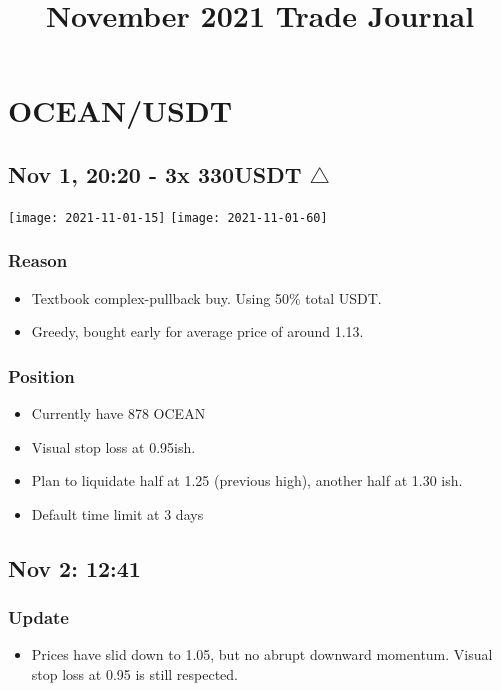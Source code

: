 \documentclass{../notes}
\title{November 2021 Trade Journal}
\begin{document}
\maketitle


\section{OCEAN/USDT}
\subsection{Nov 1, 20:20 - 3x 330USDT $\bigtriangleup$}
\texttt{[image: 2021-11-01-15]}
\texttt{[image: 2021-11-01-60]}
\subsubsection{Reason}
\begin{itemize}
  \item Textbook complex-pullback buy. Using 50\% total USDT.
  \item Greedy, bought early for average price of around 1.13.
\end{itemize}
\subsubsection{Position}
\begin{itemize}
  \item Currently have 878 OCEAN
  \item Visual stop loss at 0.95ish.
  \item Plan to liquidate half at 1.25 (previous high), another half at 1.30 ish.
  \item Default time limit at 3 days
\end{itemize}

\subsection{Nov 2: 12:41}
\subsubsection{Update}
\begin{itemize}
  \item Prices have slid down to 1.05, but no abrupt downward momentum. Visual stop loss at 0.95 is still respected. 
\end{itemize}
\end{document}
